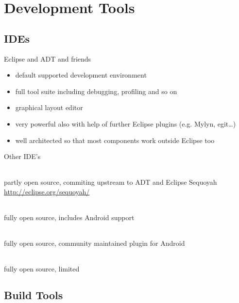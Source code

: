 \documentclass[aspectratio=169]{beamer}
\newcommand{\surl}[1] {{\tiny \url{#1}}}
\begin{document}
\section{Development Tools}

  \subsection{IDEs}

    \begin{frame}{Eclipse and ADT and friends}
        \begin{itemize}
          \item<1-> default supported development environment 
          \item<2-> full tool suite including debugging, profiling and so on
          \item<3-> graphical layout editor
          \item<4-> very powerful also with help of further Eclipse plugins (e.g. Mylyn, egit\dots)
          \item<5-> well architected so that most components work outside Eclipse too
        \end{itemize}
    \end{frame}

    \begin{frame}{Other IDE's}
      \begin{description}
        \item<1->[Motorola MOTODEV Studio \surl{http://developer.motorola.com/docstools/motodevstudio/}] \hfill \\  partly open source, commiting upstream to ADT and Eclipse Sequoyah \surl{http://eclipse.org/sequoyah/} 
        \item<2->[Jetbrains IntelliJ IDEA CE \surl{http://www.jetbrains.org/}] \hfill \\ fully open source, includes Android support 
        \item<3->[Oracle Netbeans \surl{http://kenai.com/projects/nbandroid/}] \hfill \\ fully open source, community maintained plugin for Android 
        \item<4->[Emacs \surl{http://gitorious.org/emacs-android-minor-mode}] \hfill \\ fully open source, limited
      \end{description}
    \end{frame}

  \subsection{Build Tools}
\end{document}
